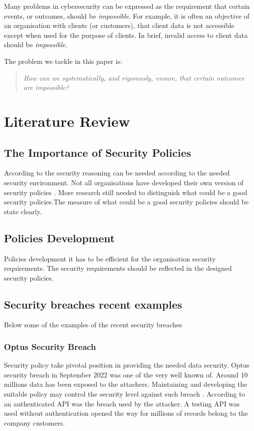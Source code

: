 \documentclass[journal]{IEEEtran}
\begin{document}
Many problems in cybersecurity can be expressed as the requirement that certain
events, or outcomes, should be {\em impossible}.
For example, it is often an objective of an organisation with clients (or
customers), that client data is not accessible except when used for the purpose
of clients. In brief, invalid access to client data should be {\em impossible}.

The problem we tackle in this paper is:
\begin{quote}\em
  How can we systematically, and rigorously, ensure, that
  certain outcomes are impossible?
\end{quote}


\section{Literature Review}

\subsection{The Importance of Security Policies}
According to \cite{glasgow1992logic} the security reasoning can
be needed according to the needed security environment.  Not all
organisations have developed their own version of security policies
\cite{paananen2020state}. More research still needed to distinguish what
could be a good security policies.The measure of what could be a good
security policies should be state clearly.

\subsection{Policies Development}
Policies development it has to be efficient for the organisation security
requirements. The security requirements should be reflected in the
designed security policies.

\subsection{Security breaches recent examples}
Below some of the examples of the recent security breaches

\subsubsection{Optus Security Breach}
Security policy take pivotal position in providing the needed data security.
Optus security breach in September 2022 was one of the very well known of.
Around 10 millions data has been exposed to the attachers. Maintaining
and developing the suitable policy may control the security level
against such breach \cite{biddle2022data}\cite{biddle2022p}.
According to \cite{paul2022}\cite{john2022} an authenticated API was
the breach used by the attacker. A testing API was used without
authentication opened the way for millions of records belong to the company customers.
\end{document}
